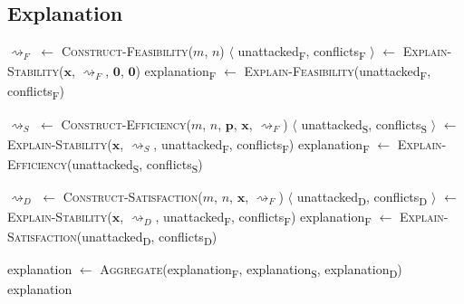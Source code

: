 \subsection{Explanation}

\begin{algorithm}
	\begin{algorithmic}[1]
				\State $\rightsquigarrow_F$ $\gets$ \textsc{Construct-Feasibility}($m$, $n$)
				\State $\langle$ unattacked\textsubscript{F}, conflicts\textsubscript{F} $\rangle$ $\gets$ \textsc{Explain-Stability}($\mathbf{x}$, $\rightsquigarrow_F$, $\mathbf{0}$, $\mathbf{0}$)
				\State explanation\textsubscript{F} $\gets$ \textsc{Explain-Feasibility}(unattacked\textsubscript{F}, conflicts\textsubscript{F})

				\State $\rightsquigarrow_S$ $\gets$ \textsc{Construct-Efficiency}($m$, $n$, $\mathbf{p}$, $\mathbf{x}$, $\rightsquigarrow_F$)
				\State $\langle$ unattacked\textsubscript{S}, conflicts\textsubscript{S} $\rangle$ $\gets$ \textsc{Explain-Stability}($\mathbf{x}$, $\rightsquigarrow_S$, unattacked\textsubscript{F}, conflicts\textsubscript{F})
				\State explanation\textsubscript{F} $\gets$ \textsc{Explain-Efficiency}(unattacked\textsubscript{S}, conflicts\textsubscript{S})

				\State $\rightsquigarrow_D$ $\gets$ \textsc{Construct-Satisfaction}($m$, $n$, $\mathbf{x}$, $\rightsquigarrow_F$)
				\State $\langle$ unattacked\textsubscript{D}, conflicts\textsubscript{D} $\rangle$ $\gets$ \textsc{Explain-Stability}($\mathbf{x}$, $\rightsquigarrow_D$, unattacked\textsubscript{F}, conflicts\textsubscript{F})
				\State explanation\textsubscript{F} $\gets$ \textsc{Explain-Satisfaction}(unattacked\textsubscript{D}, conflicts\textsubscript{D})
				
				\State explanation $\gets$ \textsc{Aggregate}(explanation\textsubscript{F}, explanation\textsubscript{S}, explanation\textsubscript{D})
				\State \Return explanation
		\EndFunction
	\end{algorithmic}
\end{algorithm}
